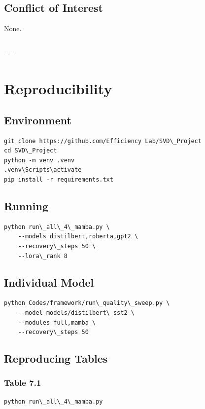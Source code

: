 \subsection{Conflict of Interest}

None.
\begin{lstlisting}

---
\end{lstlisting}

\section{Reproducibility}

\subsection{Environment}

\begin{lstlisting}
git clone https://github.com/Efficiency Lab/SVD\_Project
cd SVD\_Project
python -m venv .venv
.venv\Scripts\activate
pip install -r requirements.txt
\end{lstlisting}

\subsection{Running}

\begin{lstlisting}
python run\_all\_4\_mamba.py \
    --models distilbert,roberta,gpt2 \
    --recovery\_steps 50 \
    --lora\_rank 8
\end{lstlisting}

\subsection{Individual Model}

\begin{lstlisting}
python Codes/framework/run\_quality\_sweep.py \
    --model models/distilbert\_sst2 \
    --modules full,mamba \
    --recovery\_steps 50
\end{lstlisting}

\subsection{Reproducing Tables}

\subsubsection{Table 7.1}
\begin{lstlisting}
python run\_all\_4\_mamba.py
\end{lstlisting}

